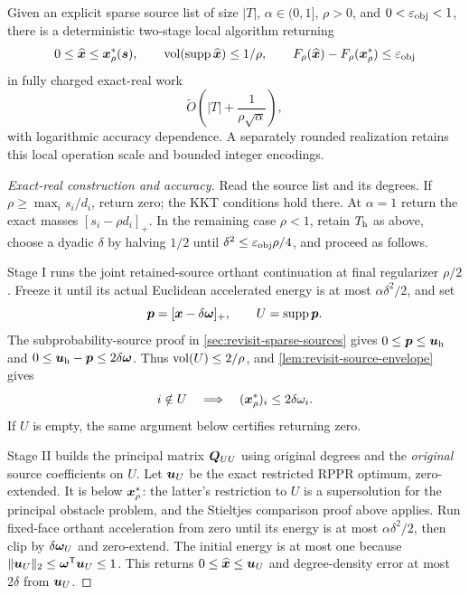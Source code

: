 \begin{theorem}
\label{thm:revisit-general-rppr}
Given an explicit sparse source list of size $|T|$, $\alpha\in(0,1]$,
$\rho>0$, and $0<\varepsilon_{\mathrm{obj}}<1$, there is a deterministic two-stage local
algorithm returning
\[
 0\leq\widehat{\bm{x}}\leq\bm{x}_\rho^*(\bm{s}),\qquad
 \operatorname{vol}(\operatorname{supp}\widehat{\bm{x}})\leq1/\rho,
 \qquad F_\rho(\widehat{\bm{x}})-F_\rho(\bm{x}_\rho^*)\leq\varepsilon_{\mathrm{obj}}
\]
in fully charged exact-real work
\[
 \widetilde O\!\left(|T|+\frac1{\rho\sqrt\alpha}\right),
\]
with logarithmic accuracy dependence. A separately rounded realization
retains this local operation scale and bounded integer encodings.
\end{theorem}
\begin{proof}[Exact-real construction and accuracy]
Read the source list and its degrees. If
$\rho\geq\max_i s_i/d_i$, return zero; the KKT conditions hold there.
At $\alpha=1$ return the exact masses $[s_i-\rho d_i]_+$.
In the remaining case $\rho<1$, retain $T_{\rm h}$ as above, choose a
dyadic $\delta$ by halving $1/2$ until
$\delta^2\leq\varepsilon_{\mathrm{obj}}\rho/4$, and proceed as follows.

Stage I runs the joint retained-source orthant continuation at final
regularizer $\rho/2$. Freeze it until its actual Euclidean accelerated
energy is at most $\alpha\delta^2/2$, and set
\[
 \bm{p}=[\bm{x}-\delta\bm{\omega}]_+,\qquad U=\operatorname{supp}\bm{p}.
\]
The subprobability-source proof in \cref{sec:revisit-sparse-sources} gives
$0\leq\bm{p}\leq\bm{u}_{\rm h}$ and
$0\leq\bm{u}_{\rm h}-\bm{p}\leq2\delta\bm{\omega}$.
Thus $\operatorname{vol}(U)\leq2/\rho$, and
\cref{lem:revisit-source-envelope} gives
\begin{equation}
 i\notin U\quad\Longrightarrow\quad
 (\bm{x}_\rho^*)_i\leq2\delta\omega_i.
 \label{eq:revisit-missing-source-support}
\end{equation}
If $U$ is empty, the same argument below certifies returning zero.

Stage II builds the principal matrix $\bm{Q}_{UU}$ using original degrees
and the \emph{original} source coefficients on $U$. Let $\bm{u}_U$ be the
exact restricted RPPR optimum, zero-extended. It is below $\bm{x}_\rho^*$:
the latter's restriction to $U$ is a supersolution for the principal
obstacle problem, and the Stieltjes comparison proof above applies.
Run fixed-face orthant acceleration from zero until its energy is at most
$\alpha\delta^2/2$, then clip by $\delta\bm{\omega}_U$ and zero-extend.
The initial energy is at most one because
$\|\bm{u}_U\|_2\leq\bm{\omega}^{\mathsf{T}}\bm{u}_U\leq1$.
This returns $0\leq\widehat{\bm{x}}\leq\bm{u}_U$ and degree-density error at
most $2\delta$ from $\bm{u}_U$.


\end{proof}
